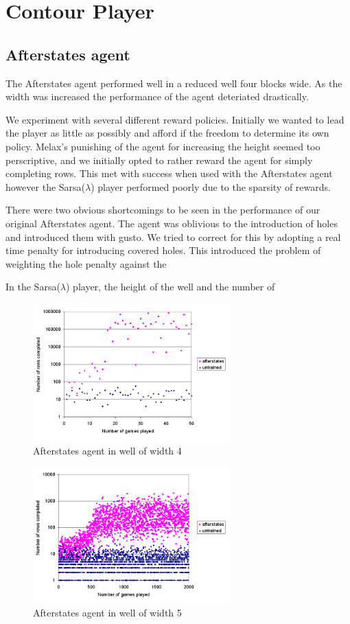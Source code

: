 \documentclass{rucsthesis}
\begin{document}
\chapter{Contour Player}

\section{Afterstates agent}

The Afterstates agent performed well in a reduced well four blocks wide. As the width was increased the performance of the agent deteriated drastically. 

We experiment with several different reward policies. Initially we wanted to lead the player as little as possibly and afford if the freedom to determine its own policy. Melax's punishing of the agent for increasing the height seemed too perscriptive, and we initially opted to rather reward the agent for simply completing rows. This met with success when used with the Afterstates agent however the Sarsa($\lambda$) player performed poorly due to the sparsity of rewards.

There were two obvious shortcomings to be seen in the performance of our original Afterstates agent. The agent was oblivious to the introduction of holes and introduced them with gusto. We tried to correct for this by adopting a real time penalty for introducing covered holes. This introduced the problem of weighting the hole penalty against the  

In the Sarsa($\lambda$) player, the height of the well and the number of 
\begin{figure}[h]
\centering
\includegraphics[width=3in]{Afterstatesredtet4well.png}
\caption{Afterstates agent in well of width 4}
\label{fig:comparemelax}
\end{figure}

\begin{figure}[h]
\centering
\includegraphics[width=3in]{Afterstatesredtet5well.png}
\caption{Afterstates agent in well of width 5}
\label{fig:comparemelax}
\end{figure}
\end{document}
